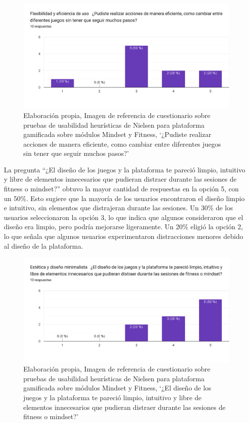 \begin{figure}[H]
  \centering
  \includegraphics[width=0.7\linewidth]{Imagenes/Nc7.png}
  \caption{Elaboración propia, Imagen de referencia de cuestionario sobre pruebas de usabilidad heurísticas de Nielsen para plataforma gamificada sobre módulos Mindset y Fitness, `¿Pudiste realizar acciones de manera eficiente, como cambiar entre diferentes juegos sin tener que seguir muchos pasos?'}

  \label{fig:cuestionario7nielsen}
\end{figure}

La pregunta ``¿El diseño de los juegos y la plataforma te pareció limpio, intuitivo y libre de elementos innecesarios que pudieran distraer durante las sesiones de fitness o mindset?'' obtuvo la mayor cantidad de respuestas en la opción 5, con un 50\%. Esto sugiere que la mayoría de los usuarios encontraron el diseño limpio e intuitivo, sin elementos que distrajeran durante las sesiones. Un 30\% de los usuarios seleccionaron la opción 3, lo que indica que algunos consideraron que el diseño era limpio, pero podría mejorarse ligeramente. Un 20\% eligió la opción 2, lo que señala que algunos usuarios experimentaron distracciones menores debido al diseño de la plataforma.

\begin{figure}[H]
  \centering
  \includegraphics[width=0.7\linewidth]{Imagenes/Nc8.png}
  \caption{Elaboración propia, Imagen de referencia de cuestionario sobre pruebas de usabilidad heurísticas de Nielsen para plataforma gamificada sobre módulos Mindset y Fitness, `¿El diseño de los juegos y la plataforma te pareció limpio, intuitivo y libre de elementos innecesarios que pudieran distraer durante las sesiones de fitness o mindset?'}

  \label{fig:cuestionario8nielsen}
\end{figure}
